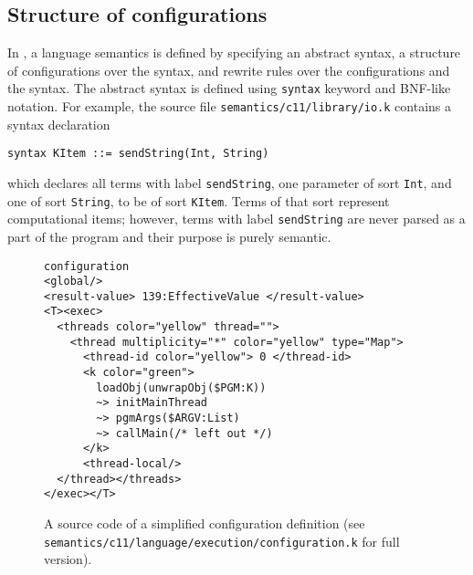 \documentclass{fithesis3}
\begin{document}
\subsection{Structure of configurations}


In \K, a language semantics is defined by specifying an abstract syntax, a structure of configurations over the syntax, and rewrite rules over the configurations and the syntax. The abstract syntax is defined using \texttt{syntax} keyword and BNF-like notation. For example, the
source file \texttt{semantics/c11/library/io.k} contains a syntax declaration
\begin{lstlisting}[language=k]
syntax KItem ::= sendString(Int, String)
\end{lstlisting}
which declares all terms with label \texttt{sendString}, one parameter of sort \texttt{Int}, and one of sort \texttt{String}, to be of sort \texttt{KItem}. Terms of that sort represent computational items; however, terms with label \texttt{sendString} are never parsed as a part of the program and their purpose is purely semantic. 


\begin{figure}
\begin{lstlisting}[language=k]
configuration
<global/>
<result-value> 139:EffectiveValue </result-value>
<T><exec>
  <threads color="yellow" thread="">
    <thread multiplicity="*" color="yellow" type="Map">
      <thread-id color="yellow"> 0 </thread-id>
      <k color="green">
        loadObj(unwrapObj($PGM:K))
        ~> initMainThread
        ~> pgmArgs($ARGV:List)
        ~> callMain(/* left out */)
      </k>
      <thread-local/>
  </thread></threads>
</exec></T>
\end{lstlisting}
\caption{A source code of a simplified configuration definition (see \texttt{semantics/c11/language/execution/configuration.k} for full version).}
\label{exampleConfigurationDefinition}
\end{figure}
\end{document}
